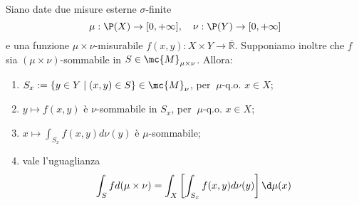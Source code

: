 
\begin{shadedTheorem}[$***$\,|\,Fubini]\label{thm: fubini}
    Siano date due misure esterne $\sigma$-finite
    \[\mu: \P(X) \rightarrow[0,+\infty], \quad \nu: \P(Y) \rightarrow[0,+\infty]\]
    e una funzione $\mu \times \nu$-misurabile $f(x, y): X \times Y \rightarrow \overline{\mathbb{R}}$. Supponiamo inoltre che $f$ sia $(\mu \times \nu)$-sommabile in $S \in \mc{M}_{\mu \times \nu}$. Allora:
    \begin{enumerate}
    \item $S_{x}:=\{y \in Y \mid(x, y) \in S\} \in \mc{M}_{\nu}$, per $\ \mu$-q.o. $x \in X$;
    
    \item $y \mapsto f(x, y)$ è $\nu$-sommabile in $S_{x}$, per $\ \mu$-q.o. $x \in X$;
    
    \item $x \mapsto \int_{S_{x}} f(x, y) d \nu(y)$ è $\mu$-sommabile;
    
    \item vale l'uguaglianza
    \[\int_{S} f d(\mu \times \nu)=\int_{X}\left[\int_{S_{x}} f(x, y) d \nu(y)\right] \d \mu(x)\]
    \end{enumerate}
\end{shadedTheorem}
